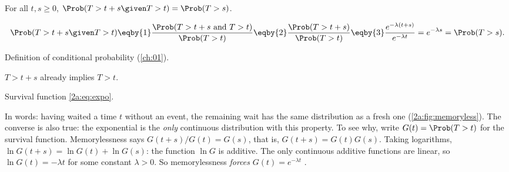 \begin{keyidea}
For all $t,s\ge0$, $\Prob(T>t+s\given T>t)=\Prob(T>s)$.
\end{keyidea}
\begin{align*}
  \Prob(T>t+s\given T>t) \eqby{1} \frac{\Prob(T>t+s\text{ and }T>t)}{\Prob(T>t)} \eqby{2} \frac{\Prob(T>t+s)}{\Prob(T>t)} \eqby{3} \frac{e^{-\lambda(t+s)}}{e^{-\lambda t}} = e^{-\lambda s} = \Prob(T>s).
\end{align*}
\begin{explain}
  \item Definition of conditional probability (\cref{ch:01}).
  \item $T>t+s$ already implies $T>t$.
  \item Survival function \eqref{2a:eq:expo}.
\end{explain}
In words: having waited a time $t$ without an event, the remaining wait has the same distribution as a fresh one (\cref{2a:fig:memoryless}). The converse is also true: the exponential is the \emph{only} continuous distribution with this property. To see why, write $G(t)=\Prob(T>t)$ for the survival function. Memorylessness says $G(t+s)/G(t)=G(s)$, that is, $G(t+s)=G(t)G(s)$. Taking logarithms, $\ln G(t+s)=\ln G(t)+\ln G(s)$: the function $\ln G$ is additive. The only continuous additive functions are linear, so $\ln G(t)=-\lambda t$ for some constant $\lambda>0$. So memorylessness \emph{forces} $G(t)=e^{-\lambda t}$ .


